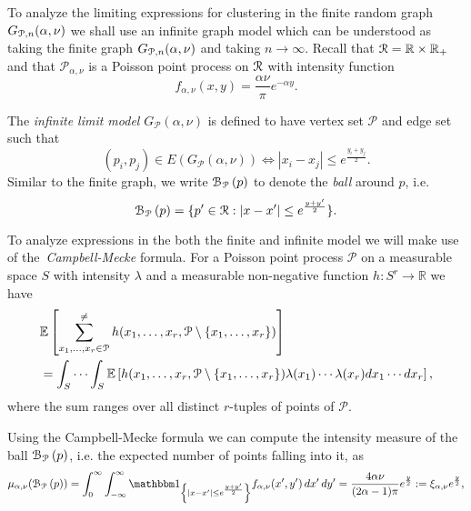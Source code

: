 To analyze the limiting expressions for clustering in the finite random graph $G_{{\mathcal P},n}(\alpha, \nu)$ we shall use an infinite graph model which can be understood as taking the finite graph $G_{{\mathcal P},n}(\alpha,\nu)$ and taking $n \to \infty$. Recall that ${\mathcal R} = \mathbb{R} \times \mathbb{R}_+$ and that $\mathcal{P}_{\alpha,\nu}$ is a Poisson point process on ${\mathcal R}$ with intensity function
\[
	f_{\alpha,\nu}(x,y) = \frac{\alpha \nu}{\pi} e^{-\alpha y}.
\]

The \emph{infinite limit model} $G_{\mathcal{P}}(\alpha, \nu)$ is defined to have vertex set $\mathcal{P}$ and edge set such that
\[
	(p_i, p_j) \in E(G_{\mathcal{P}}(\alpha, \nu)) \iff |x_i - x_j| \leq e^{\frac{y_i + y_j}{2}}.
\]
Similar to the finite graph, we write ${\mathcal B}_{{\mathcal P}}\left(p\right)$ to denote the \emph{ball} around $p$, i.e.
\begin{equation}\label{eq:def_ball_P}
	{\mathcal B}_{{\mathcal P}}\left(p\right) = \{p^\prime \in {\mathcal R} : |x - x^\prime| \leq e^{\frac{y + y^\prime}{2}}\}.
\end{equation}

To analyze expressions in the both the finite and infinite model we will make use of the~\emph{Campbell-Mecke} formula. 
For a Poisson point process $\mathcal{P}$ on a measurable space $S$ with intensity $\lambda$ and a measurable non-negative function $h: S^r \rightarrow \mathbb{R}$ we have
\begin{equation}\label{eq:def_Campbell-Mecke}
\begin{split}
& \mathbb{E}\left[\sum_{x_1,\ldots, x_r \in \mathcal{P}}^{\neq} h (x_1, \ldots, x_r,
\mathcal{P} \setminus \{x_1,\ldots, x_r\}) \right]\\
& = \int_S \cdots \int_S
\mathbb{E}\left[h(x_1,\ldots, x_r,\mathcal{P} \setminus \{x_1,\ldots, x_r\}) \lambda (x_1) \cdots \lambda (x_r) dx_1 \cdots dx_r\right],
\end{split}
\end{equation}
where the sum ranges over all distinct $r$-tuples of points of $\mathcal{P}$.

Using the Campbell-Mecke formula we can compute the intensity measure of the ball ${\mathcal B}_{{\mathcal P}}\left(p\right)$, i.e. the expected number of points falling into it, as
\begin{equation}\label{eq:mu_ball_y_P}
	\mu_{\alpha, \nu}(\BallPo{p}) = \int_0^\infty \int_{-\infty}^\infty \ind{|x-x^\prime| \le e^{\frac{y + y^\prime}{2}}}
	f_{\alpha,\nu}(x^\prime, y^\prime) \, dx^\prime \, dy^\prime 
	= \frac{4\alpha \nu}{(2\alpha - 1)\pi} e^{\frac{y}{2}} := \xi_{\alpha,\nu}e^{\frac{y}{2}},
\end{equation}

